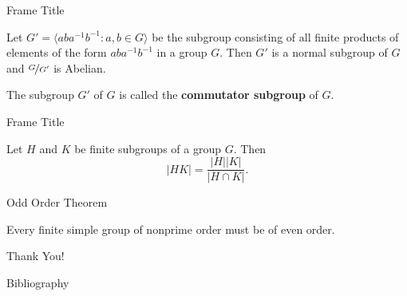 \documentclass{beamer}
\begin{document}
\begin{frame}{Frame Title}
    \begin{theorem}
        \justifying
        Let $G' = \langle aba^{-1}b^{-1}: a, b \in G\rangle$ be the subgroup consisting of all finite products of elements of the form $aba^{-1}b^{-1}$ in a group $G$. Then $G'$ is a normal subgroup of $G$ and $\nicefrac{G}{G'}$ is Abelian.
    \end{theorem}

    The subgroup $G'$ of $G$ is called the \textbf{commutator subgroup} of $G$.
\end{frame}

\begin{frame}{Frame Title}
    \begin{lemma}
        \justifying
        Let $H$ and $K$ be finite subgroups of a group $G$. Then
        \[|HK| = \dfrac{|H||K|}{|H \cap K|}.\]
    \end{lemma}
\end{frame}

\begin{frame}{Odd Order Theorem}
    \begin{theorem}
        \justifying
        Every finite simple group of nonprime order must be of even order.
    \end{theorem}
\end{frame}

\begin{frame}[focus]
Thank You!
\end{frame}

\begin{frame}[allowframebreaks]{Bibliography}
\nocite{*}


\end{frame}    
    
\end{document}
